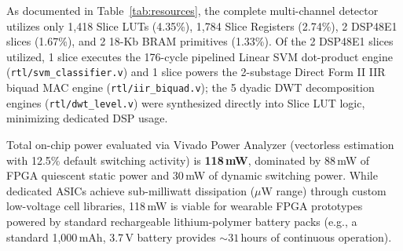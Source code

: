 \documentclass[10pt,twocolumn,letterpaper]{article}
\begin{document}
{As documented in Table~\ref{tab:resources}, the complete multi-channel detector utilizes only 1,418 Slice LUTs (4.35\%), 1,784 Slice Registers (2.74\%), 2 DSP48E1 slices (1.67\%), and 2 18-Kb BRAM primitives (1.33\%). Of the 2 DSP48E1 slices utilized, 1 slice executes the 176-cycle pipelined Linear SVM dot-product engine (\texttt{rtl/svm\_classifier.v}) and 1 slice powers the 2-substage Direct Form II IIR biquad MAC engine (\texttt{rtl/iir\_biquad.v}); the 5 dyadic DWT decomposition engines (\texttt{rtl/dwt\_level.v}) were synthesized directly into Slice LUT logic, minimizing dedicated DSP usage. \begin{table}[t]
\centering
\footnotesize
\color{blue}
\caption{\textcolor{blue}{Per-module hardware resource breakdown (Spartan-7 XC7S50).}}
\label{tab:module_breakdown}
\end{table}

Total on-chip power evaluated via Vivado Power Analyzer (vectorless estimation with 12.5\% default switching activity) is \textbf{118\,mW}, dominated by 88\,mW of FPGA quiescent static power and 30\,mW of dynamic switching power. While dedicated ASICs achieve sub-milliwatt dissipation ($\mu$W range) through custom low-voltage cell libraries, 118\,mW is viable for wearable FPGA prototypes powered by standard rechargeable lithium-polymer battery packs (e.g., a standard 1,000\,mAh, 3.7\,V battery provides $\sim 31$\,hours of continuous operation).

}
\end{document}
